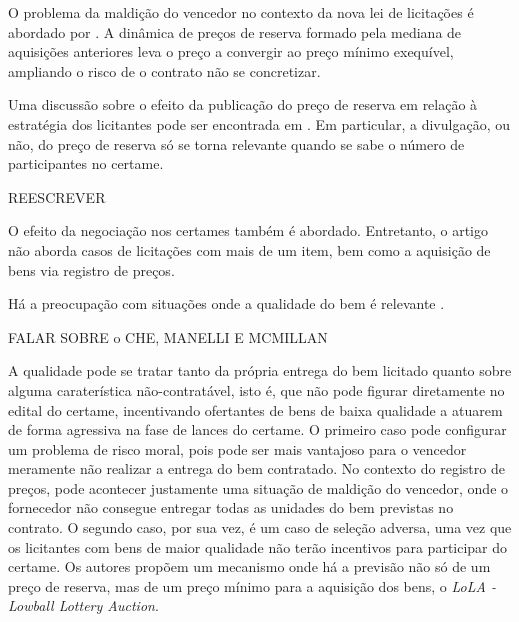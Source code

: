 O problema da maldição do vencedor no contexto da nova lei de licitações é abordado por \citet{Signor2022}. A dinâmica de preços de reserva formado pela mediana de aquisições anteriores leva o preço a convergir ao preço mínimo exequível, ampliando o risco de o contrato não se concretizar. 

Uma discussão sobre o efeito da publicação do preço de reserva em relação à estratégia dos licitantes pode ser encontrada em \citet{Bugarin2022}. Em particular, a divulgação, ou não, do preço de reserva só se torna relevante quando se sabe o número de participantes no certame.

{\huge REESCREVER}

O efeito da negociação nos certames também é abordado. Entretanto, o artigo não aborda casos de licitações com mais de um item, bem como a aquisição de bens via registro de preços.

Há a preocupação com situações onde a qualidade do bem é relevante \citet{villa:2022}.

{\huge FALAR SOBRE o CHE, MANELLI E MCMILLAN}

A qualidade pode se tratar tanto da própria entrega do bem licitado quanto sobre alguma caraterística não-contratável, isto é, que não pode figurar diretamente no edital do certame, incentivando ofertantes de bens de baixa qualidade a atuarem de forma agressiva na fase de lances do certame. O primeiro caso pode configurar um problema de risco moral, pois pode ser mais vantajoso para o vencedor meramente não realizar a entrega do bem contratado. No contexto do registro de preços, pode acontecer justamente uma situação de maldição do vencedor, onde o fornecedor não consegue entregar todas as unidades do bem previstas no contrato. O segundo caso, por sua vez, é um caso de seleção adversa, uma vez que os licitantes com bens de maior qualidade não terão incentivos para participar do certame. Os autores propõem um mecanismo onde há a previsão não só de um preço de reserva, mas de um preço mínimo para a aquisição dos bens, o \emph{LoLA - Lowball Lottery Auction}.
